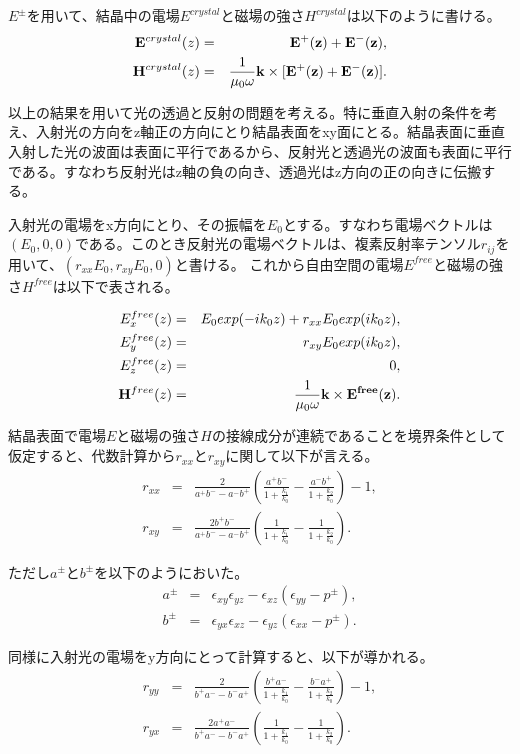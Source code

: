 $E^\pm$を用いて、結晶中の電場$E^{crystal}$と磁場の強さ$H^{crystal}$は以下のように書ける。
\begin{eqnarray}
{\bf E}^{crystal}(z) &=& {\bf E^+(z) + E^-(z) } ,\\
{\bf H}^{crystal}(z) &=& \frac{1}{\mu_0 \omega} {\bf k} \times [{\bf E^+(z) + E^-(z)}].
\end{eqnarray}


以上の結果を用いて光の透過と反射の問題を考える。特に垂直入射の条件を考え、入射光の方向をz軸正の方向にとり結晶表面をxy面にとる。結晶表面に垂直入射した光の波面は表面に平行であるから、反射光と透過光の波面も表面に平行である。すなわち反射光はz軸の負の向き、透過光はz方向の正の向きに伝搬する。

入射光の電場をx方向にとり、その振幅を$E_0$とする。すなわち電場ベクトルは$(E_0,0,0)$である。このとき反射光の電場ベクトルは、複素反射率テンソル$r_{ij}$を用いて、$(r_{xx}E_0, r_{xy}E_0,0)$と書ける。
これから自由空間の電場$E^{free}$と磁場の強さ$H^{free}$は以下で表される。

\begin{eqnarray}
E_x^{free} (z) &=& E_0 exp(-ik_0 z) + r_{xx}E_0 exp(ik_0 z),\\
E_y^{free} (z) &=& r_{xy}E_0 exp(ik_0 z),\\
E_z^{free} (z) &=& 0,\\
{\bf H}^{free}(z) &=& \frac{1}{\mu_0 \omega} {\bf k} \times {\bf E^{free}(z)}.
\end{eqnarray}


結晶表面で電場$E$と磁場の強さ$H$の接線成分が連続であることを境界条件として仮定すると、代数計算から$r_{xx}$と$r_{xy}$に関して以下が言える。
\begin{eqnarray}
r_{xx} &=& \frac{2}{a^+ b^- - a^- b^+} (\frac{a^+ b^-}{1+\frac{k_1}{k_0}} - \frac{a^- b^+}{1+\frac{k_2}{k_0}} )-1,\\
r_{xy} &=& \frac{2b^+ b^-}{a^+ b^- - a^- b^+} (\frac{1}{1+\frac{k_1}{k_0}} - \frac{1}{1+\frac{k_2}{k_0}} ).
\end{eqnarray}

ただし$a^\pm$と$b^\pm$を以下のようにおいた。
\begin{eqnarray}
a^\pm &=& \epsilon_{xy} \epsilon_{yz} - \epsilon_{xz}(\epsilon_{yy}-p^\pm),\\
b^\pm &=& \epsilon_{yx} \epsilon_{xz} - \epsilon_{yz}(\epsilon_{xx}-p^\pm).
\end{eqnarray}

同様に入射光の電場をy方向にとって計算すると、以下が導かれる。
\begin{eqnarray}
r_{yy} &=& \frac{2}{b^+ a^- - b^- a^+} (\frac{b^+ a^-}{1+\frac{k_1}{k_0}} - \frac{b^- a^+}{1+\frac{k_2}{k_0}} )-1,\\
r_{yx} &=& \frac{2a^+ a^-}{b^+ a^- - b^- a^+} (\frac{1}{1+\frac{k_1}{k_0}} - \frac{1}{1+\frac{k_2}{k_0}} ).
\end{eqnarray}

